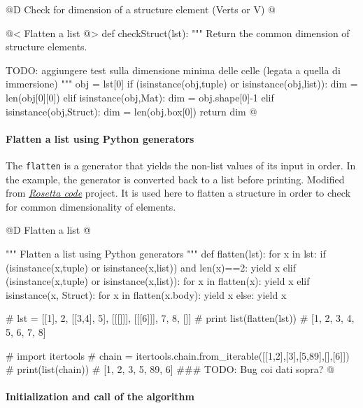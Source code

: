 \documentclass[11pt,oneside]{article}    %
\begin{document}
@D Check for dimension of a structure element (Verts or V)
@{@< Flatten a list @>
def checkStruct(lst):
    """ Return the common dimension of structure elements.

        TODO: aggiungere test sulla dimensione minima delle celle (legata a quella di immersione)
    """
    obj = lst[0]
    if (isinstance(obj,tuple) or isinstance(obj,list)):
        dim = len(obj[0][0])
    elif isinstance(obj,Mat): 
        dim = obj.shape[0]-1    
    elif isinstance(obj,Struct): 
        dim = len(obj.box[0])    
    return dim
@}

\paragraph{Flatten a list using Python generators}
The \texttt{flatten} is a generator that yields the non-list values of its input in order. In the example, the generator is converted back to a list before printing. Modified from \href{http://rosettacode.org/wiki/Flatten_a_list#Python}{\emph{Rosetta code}} project. It is used here to flatten a structure in order to check for common dimensionality of elements.

@D Flatten a list
@{""" Flatten a list using Python generators """
def flatten(lst):
    for x in lst:
        if (isinstance(x,tuple) or isinstance(x,list)) and len(x)==2:
            yield x
        elif (isinstance(x,tuple) or isinstance(x,list)):
            for x in flatten(x):
                yield x
        elif isinstance(x, Struct):
            for x in flatten(x.body):
                yield x
        else:
            yield x
 
#  lst = [[1], 2, [[3,4], 5], [[[]]], [[[6]]], 7, 8, []]
#  print list(flatten(lst)) 
#  [1, 2, 3, 4, 5, 6, 7, 8]

#  import itertools
#  chain = itertools.chain.from_iterable([[1,2],[3],[5,89],[],[6]])
#  print(list(chain))
#  [1, 2, 3, 5, 89, 6]    ###  TODO: Bug coi dati sopra?
@}

\paragraph{Initialization and call of the algorithm}
\end{document}
